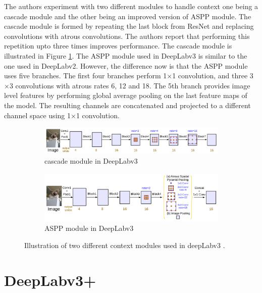 The authors experiment with two different modules to handle context one being a cascade module and the other being an improved version of ASPP module. The cascade module is formed by repeating the last block from ResNet and replacing convolutions with atrous convolutions. The authors report that performing this repetition upto three times improves performance. 	The cascade module is illustrated in Figure \ref{Fig:contextmodulea}. The ASPP module used in DeepLabv3 is similar to the one used in DeepLabv2. However, the difference now is that the ASPP module uses five branches. The first four branches perform 1$\times$1 convolution, and three 3$\times$3 convolutions with atrous rates 6, 12 and 18. The 5th branch provides image level features by performing global average pooling on the last feature maps of the model. The resulting channels are concatenated and projected to a different channel space using 1$\times$1 convolution.

	\begin{figure}
		\begin{subfigure}{1\textwidth}
			\centering
			\includegraphics[width=1\linewidth]{images/cascade_module}
			\caption{cascade module in DeepLabv3}
			\label{Fig:contextmodulea}
		\end{subfigure}
		\begin{subfigure}{1\textwidth}
			\centering
			\includegraphics[width=1\linewidth]{images/aspp_module}
			\caption{ASPP module in DeepLabv3}
			\label{Fig:contextmoduleb}
		\end{subfigure}
		\caption{Illustration of two different context modules used in deepLabv3 \cite{DBLP:journals/corr/ChenPSA17}.}
		\label{Fig:contextmodule}
	\end{figure}

\section{DeepLabv3+}

